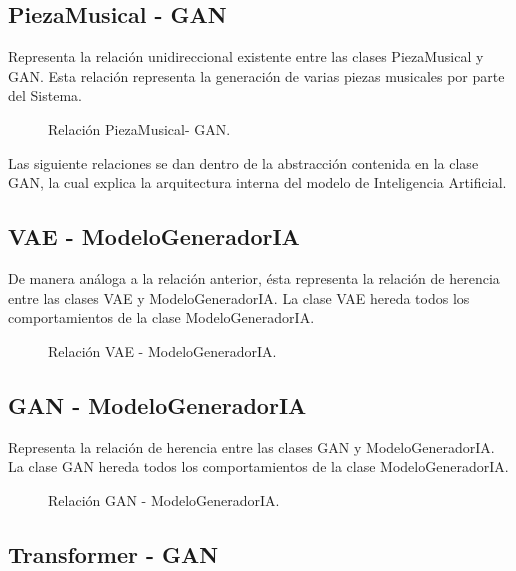 \subsection{PiezaMusical - GAN}

Representa la relación unidireccional existente entre las clases PiezaMusical y GAN. Esta relación representa la generación de varias piezas musicales por parte del Sistema.

\begin{figure}[H]
  \centering
  
  \caption{Relación PiezaMusical- GAN.}
\end{figure}

Las siguiente relaciones se dan dentro de la abstracción contenida en la clase GAN, la cual explica la arquitectura interna del modelo de Inteligencia Artificial.

\subsection{VAE - ModeloGeneradorIA}

De manera análoga a la relación anterior, ésta representa la relación de herencia entre las clases VAE y ModeloGeneradorIA. La clase VAE hereda todos los comportamientos de la clase ModeloGeneradorIA.

\begin{figure}[H]
  \centering
  
  \caption{Relación VAE - ModeloGeneradorIA.}
\end{figure}

\subsection{GAN - ModeloGeneradorIA}

Representa la relación de herencia entre las clases GAN y ModeloGeneradorIA. La clase GAN hereda todos los comportamientos de la clase ModeloGeneradorIA.

\begin{figure}[H]
  \centering
  
  \caption{Relación GAN - ModeloGeneradorIA.}
\end{figure}

\subsection{Transformer - GAN}

